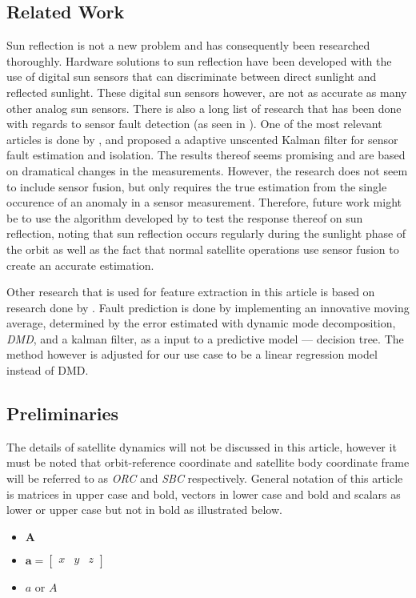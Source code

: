 \documentclass[letterpaper, 10 pt, conference]{ieeeconf}  %
\begin{document}
\subsection{Related Work}
Sun reflection is not a new problem and has consequently been researched thoroughly. Hardware solutions to sun reflection have been developed with the use of digital sun sensors that can discriminate between direct sunlight and reflected sunlight. These digital sun sensors however, are not as accurate as many other analog sun sensors. There is also a long list of research that has been done with regards to sensor fault detection (as seen in \cite{wang2019adaptive}). One of the most relevant articles is done by \textcite{wang2019adaptive}, and proposed a adaptive unscented Kalman filter for sensor fault estimation and isolation. The results thereof seems promising and are based on dramatical changes in the measurements. However, the research does not seem to include sensor fusion, but only requires the true estimation from the single occurence of an anomaly in a sensor measurement. Therefore, future work might be to use the algorithm developed by \textcite{wang2019adaptive} to test the response thereof on sun reflection, noting that sun reflection occurs regularly during the sunlight phase of the orbit as well as the fact that normal satellite operations use sensor fusion to create an accurate estimation.

Other research that is used for feature extraction in this article is based on research done by \textcite{DeSilva2020}. Fault prediction is done by implementing an innovative moving average, determined by the error estimated with dynamic mode decomposition, \emph{DMD}, and a kalman filter, as a input to a predictive model --- decision tree. The method however is adjusted for our use case to be a linear regression model instead of DMD.

\subsection{Preliminaries}
The details of satellite dynamics will not be discussed in this article, however it must be noted that orbit-reference coordinate and satellite body coordinate frame will be referred to as \emph{ORC} and \emph{SBC} respectively. General notation of this article is matrices in upper case and bold, vectors in lower case and bold and scalars as lower or upper case but not in bold as illustrated below.
\begin{itemize}
	\item{ $\mathbf{A}$}
	\item{ $\mathbf{a} = \begin{bmatrix} 
			x & y & z
		\end{bmatrix}$}
	\item{ $a$ or $A$}
\end{itemize}
\end{document}
